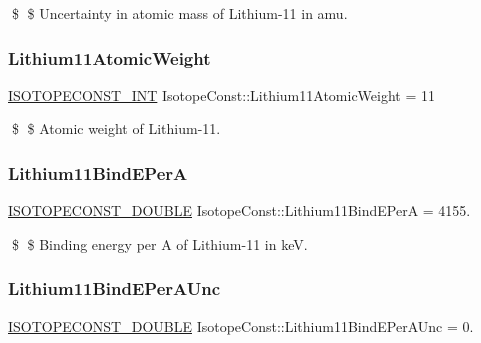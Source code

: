 \$ \$ Uncertainty in atomic mass of Lithium-\/11 in amu. \mbox{\label{group___isotope_const-_lithium-_li11_ga61425e8fa2bcbfc9fa084b0af93f2292}} 
\subsubsection{\texorpdfstring{Lithium11\+Atomic\+Weight}{Lithium11AtomicWeight}}
{\footnotesize\ttfamily \mbox{\hyperlink{group___isotope_const-_macros_ga5f18360b3e99483a35c32d789e62621c}{I\+S\+O\+T\+O\+P\+E\+C\+O\+N\+S\+T\+\_\+\+I\+NT}} Isotope\+Const\+::\+Lithium11\+Atomic\+Weight = 11}

\$ \$ Atomic weight of Lithium-\/11. \mbox{\label{group___isotope_const-_lithium-_li11_ga28d3bdd72ca74a937fcd8b4fbae77513}} 
\subsubsection{\texorpdfstring{Lithium11\+Bind\+E\+PerA}{Lithium11BindEPerA}}
{\footnotesize\ttfamily \mbox{\hyperlink{group___isotope_const-_macros_ga8f45a7272ce02c0b4c65c44636ed719a}{I\+S\+O\+T\+O\+P\+E\+C\+O\+N\+S\+T\+\_\+\+D\+O\+U\+B\+LE}} Isotope\+Const\+::\+Lithium11\+Bind\+E\+PerA = 4155.}

\$ \$ Binding energy per A of Lithium-\/11 in keV. \mbox{\label{group___isotope_const-_lithium-_li11_ga1afd4962d393b4c3c163eb74a4f71179}} 
\subsubsection{\texorpdfstring{Lithium11\+Bind\+E\+Per\+A\+Unc}{Lithium11BindEPerAUnc}}
{\footnotesize\ttfamily \mbox{\hyperlink{group___isotope_const-_macros_ga8f45a7272ce02c0b4c65c44636ed719a}{I\+S\+O\+T\+O\+P\+E\+C\+O\+N\+S\+T\+\_\+\+D\+O\+U\+B\+LE}} Isotope\+Const\+::\+Lithium11\+Bind\+E\+Per\+A\+Unc = 0.}

